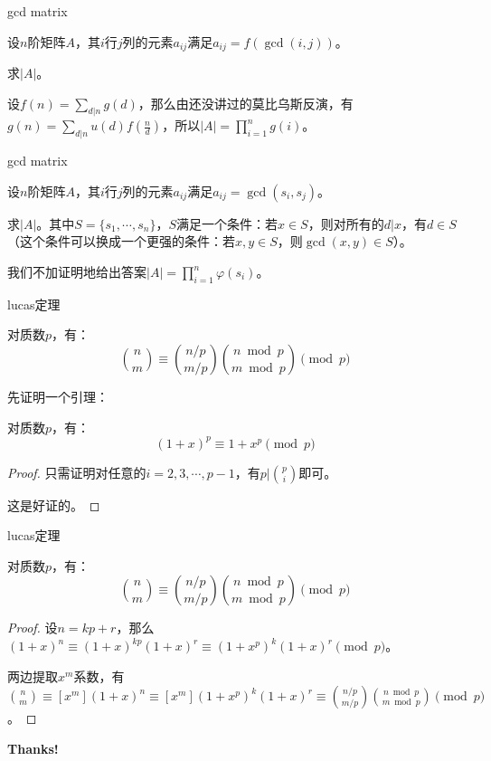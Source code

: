 \documentclass{ctexbeamer}        %
\begin{document}
\begin{frame}{gcd matrix}

\begin{example}
	设$n$阶矩阵$A$，其$i$行$j$列的元素$a_{ij}$满足$a_{ij}=f(\gcd(i,j))$。

	求$|A|$。
\end{example}
设$f(n)=\sum_{d|n} g(d)$，那么由还没讲过的莫比乌斯反演，有$g(n)=\sum_{d|n}u(d)f(\frac{n}{d})$，所以$|A|=\prod_{i=1}^n g(i)$。
\end{frame}

\begin{frame}{gcd matrix}

\begin{example}[poj3910]
	设$n$阶矩阵$A$，其$i$行$j$列的元素$a_{ij}$满足$a_{ij}=\gcd(s_i,s_j)$。

	求$|A|$。其中$S=\lbrace s_1,\cdots,s_n \rbrace$，$S$满足一个条件：若$x \in S$，则对所有的$d|x$，有$d \in S$（这个条件可以换成一个更强的条件：若$x,y \in S$，则$\gcd(x,y) \in S$）。
\end{example}
我们不加证明地给出答案$|A|=\prod_{i=1}^n \varphi(s_i)$。
\end{frame}

\begin{frame}{lucas定理}

\begin{theorem}[lucas]
	对质数$p$，有：
	$$\binom{n}{m} \equiv \binom{n/p}{m/p} \binom{n \bmod p}{m \bmod p} \pmod p$$
\end{theorem}
先证明一个引理：
\begin{theorem}
	对质数$p$，有：
	$$(1+x)^p \equiv 1+x^p \pmod p$$
\end{theorem}
\begin{proof}
	只需证明对任意的$i=2,3,\cdots,p-1$，有$p|\binom{p}{i}$即可。
	
	这是好证的。
\end{proof}
\end{frame}

\begin{frame}{lucas定理}

\begin{theorem}[lucas]
	对质数$p$，有：
	$$\binom{n}{m} \equiv \binom{n/p}{m/p} \binom{n \bmod p}{m \bmod p} \pmod p$$
\end{theorem}
\begin{proof}
	设$n=kp+r$，那么$(1+x)^n \equiv (1+x)^{kp} (1+x)^r \equiv (1+x^p)^k (1+x)^r \pmod p$。

	两边提取$x^m$系数，有$\binom{n}{m} \equiv [x^m](1+x)^n \equiv [x^m](1+x^p)^k (1+x)^r \equiv \binom{n/p}{m/p} \binom{n \bmod p}{m \bmod p} \pmod p$。
\end{proof}
\end{frame}

\begin{frame}[plain]    %
	\vspace{0.4\textheight}
	\begin{center}
		\Huge\color{blue}\bfseries Thanks!
	\end{center}
\end{frame}
\end{document}
